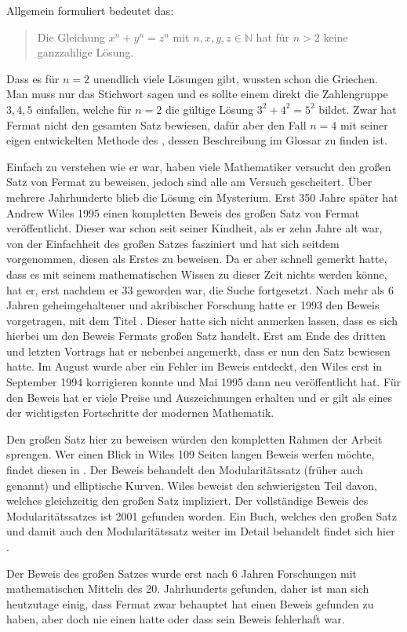 Allgemein formuliert bedeutet das:
\begin{quote}
    Die Gleichung $x^n + y^n = z^n$ mit $n,x,y,z \in \mathbb{N}$ hat für $n>2$ keine ganzzahlige Lösung.
\end{quote}

Dass es für $n = 2$ unendlich viele Lösungen gibt, wussten schon die Griechen. Man muss nur das Stichwort  sagen und es sollte einem direkt die Zahlengruppe $3,4,5$ einfallen, welche für $n = 2$ die gültige Lösung $3^2 + 4^2 = 5^2$ bildet. Zwar hat Fermat nicht den gesamten Satz bewiesen, dafür aber den Fall $n = 4$ mit seiner eigen entwickelten Methode des , dessen Beschreibung im Glossar zu finden ist.

Einfach zu verstehen wie er war, haben viele Mathematiker versucht den großen Satz von Fermat zu beweisen, jedoch sind alle am Versuch gescheitert. Über mehrere Jahrhunderte blieb die Lösung ein Mysterium. Erst 350 Jahre später hat Andrew Wiles 1995 einen kompletten Beweis des großen Satz von Fermat veröffentlicht. Dieser war schon seit seiner Kindheit, als er zehn Jahre alt war, von der Einfachheit des großen Satzes fasziniert und hat sich seitdem vorgenommen, diesen als Erstes zu beweisen. Da er aber schnell gemerkt hatte, dass es mit seinem mathematischen Wissen zu dieser Zeit nichts werden könne, hat er, erst nachdem er 33 geworden war, die Suche fortgesetzt. Nach mehr als 6 Jahren geheimgehaltener und akribischer Forschung hatte er 1993 den Beweis vorgetragen, mit dem Titel . Dieser hatte sich nicht anmerken lassen, dass es sich hierbei um den Beweis Fermats großen Satz handelt. Erst am Ende des dritten und letzten Vortrags hat er nebenbei angemerkt, dass er nun den Satz bewiesen hatte. \cite{newYorkTimes} Im August wurde aber ein Fehler im Beweis entdeckt, den Wiles erst in September 1994 korrigieren konnte und Mai 1995 dann neu veröffentlicht hat. Für den Beweis hat er viele Preise und Auszeichnungen erhalten und er gilt als eines der wichtigsten Fortschritte der modernen Mathematik.

Den großen Satz hier zu beweisen würden den kompletten Rahmen der Arbeit sprengen. Wer einen Blick in Wiles 109 Seiten langen Beweis werfen möchte, findet diesen in \cite{wilesFermat}. Der Beweis behandelt den Modularitätssatz (früher auch  genannt) und elliptische Kurven. Wiles beweist den schwierigsten Teil davon, welches gleichzeitig den großen Satz impliziert. Der vollständige Beweis des Modularitätssatzes ist 2001 gefunden worden. Ein Buch, welches den großen Satz und damit auch den Modularitätssatz weiter im Detail behandelt findet sich hier \cite{darmon}.

Der Beweis des großen Satzes wurde erst nach 6 Jahren Forschungen mit mathematischen Mitteln des 20. Jahrhunderts gefunden, daher ist man sich heutzutage einig, dass Fermat zwar behauptet hat einen Beweis gefunden zu haben, aber doch nie einen hatte oder dass sein Beweis fehlerhaft war.
